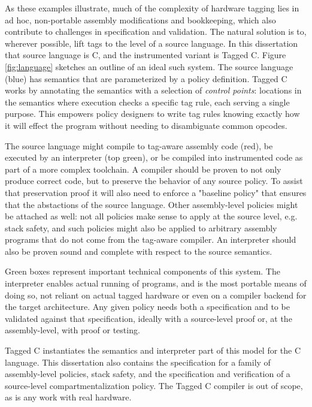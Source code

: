 As these examples illustrate, much of the complexity of hardware tagging lies in ad hoc,
non-portable assembly modifications and bookkeeping, which also contribute to challenges in
specification and validation. The natural solution is to, wherever possible, lift
tags to the level of a source language. In this dissertation that source language is C,
and the instrumented variant is Tagged C. Figure \ref{fig:language}
sketches an outline of an ideal such system. The source language (blue) has semantics that are
parameterized by a policy definition. Tagged C works by annotating the
semantics with a selection of {\em control points}: locations
in the semantics where execution checks a specific tag rule, each serving a single purpose.
This empowers policy designers to write tag rules knowing exactly how it will effect the
program without needing to disambiguate common opcodes.

The source language might compile to tag-aware assembly code (red), be executed by an
interpreter (top green), or be compiled into instrumented code as part of a more
complex toolchain. A compiler should be proven to not only
produce correct code, but to preserve the behavior of any source policy. To assist that preservation
proof it will also need to enforce a "baseline policy" that ensures that the abstactions of the
source language. Other assembly-level policies might be attached as well: not all policies make sense
to apply at the source level, e.g. stack safety, and such policies might also be applied to
arbitrary assembly programs that do not come from the tag-aware compiler.
An interpreter should also be proven sound and complete with respect to the source semantics.

Green boxes represent important technical components of this system. The interpreter enables
actual running of programs, and is the most portable means of doing so, not reliant on actual
tagged hardware or even on a compiler backend for the target architecture.
Any given policy needs both a specification and to be validated against that specification,
ideally with a source-level proof or, at the assembly-level, with proof or testing.

Tagged C instantiates the semantics and interpreter part of this model for the C language.
This dissertation also contains the specification for a family of assembly-level policies,
stack safety, and the specification and verification of a source-level compartmentalization
policy. The Tagged C compiler is out of scope, as is any work with real hardware.


